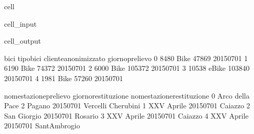 \documentclass[letterpaper,10pt,english]{jupyterBook}
\begin{document}
\begin{sphinxuseclass}{cell}
\begin{sphinxuseclass}{cell_input}
\begin{sphinxVerbatim}[commandchars=\\\{\}]
   
      

      


\end{sphinxVerbatim}

\end{sphinxuseclass}
\begin{sphinxuseclass}{cell_output}
\begin{sphinxVerbatim}[commandchars=\\\{\}]
    bici tipo\PYGZus{}bici  cliente\PYGZus{}anonimizzato giorno\PYGZus{}prelievo  \PYGZbs{}
0   8480      Bike                 47869      2015\PYGZhy{}07\PYGZhy{}01   
1   6190      Bike                 74372      2015\PYGZhy{}07\PYGZhy{}01   
2   6000      Bike                105372      2015\PYGZhy{}07\PYGZhy{}01   
3  10538     eBike                103840      2015\PYGZhy{}07\PYGZhy{}01   
4   1981      Bike                 57260      2015\PYGZhy{}07\PYGZhy{}01   

       nome\PYGZus{}stazione\PYGZus{}prelievo giorno\PYGZus{}restituzione nome\PYGZus{}stazione\PYGZus{}restituzione  
0  Arco della Pace 2 \PYGZhy{} Pagano          2015\PYGZhy{}07\PYGZhy{}01       Vercelli \PYGZhy{} Cherubini  
1                  XXV Aprile          2015\PYGZhy{}07\PYGZhy{}01                    Caiazzo  
2                 San Giorgio          2015\PYGZhy{}07\PYGZhy{}01                    Rosario  
3                  XXV Aprile          2015\PYGZhy{}07\PYGZhy{}01                    Caiazzo  
4                  XXV Aprile          2015\PYGZhy{}07\PYGZhy{}01              Sant\PYGZsq{}Ambrogio  
\end{sphinxVerbatim}

\end{sphinxuseclass}
\end{sphinxuseclass}
\end{document}
